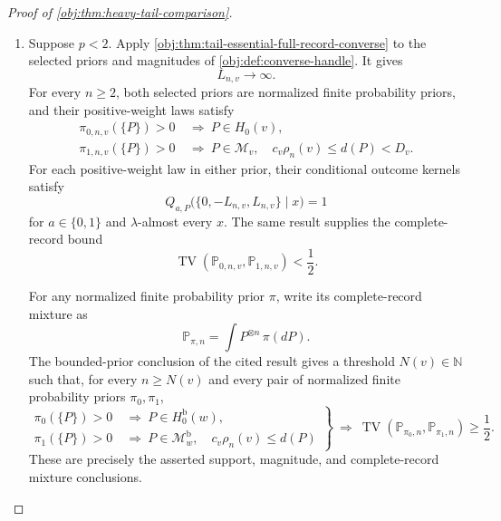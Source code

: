 \begin{proof}[Proof of \cref{obj:thm:heavy-tail-comparison}]
\begin{enumerate}
If \(p<2\), the two channel differences displayed above are strictly positive. Therefore
\[
E(p)\le E_0(p)<E_0(2),
\qquad
E(p)\le E_4(p)<E_4(2),
\]
and hence
\[
E(p)<\min\{E_0(2),E_4(2)\}=E(2).
\]
Using the scale definitions in \cref{obj:def:sharp-frontier-scales}, we obtain
\[
\frac{\rho_n(v)}{\rho_n^{\mathrm b}(w)}
=n^{E(2)-E(p)}
\longrightarrow\infty.
\]

\item Suppose \(p<2\). Apply \cref{obj:thm:tail-essential-full-record-converse} to the selected priors and magnitudes of \cref{obj:def:converse-handle}. It gives
\[
L_{n,v}\longrightarrow\infty.
\]
For every \(n\ge2\), both selected priors are normalized finite probability priors, and their positive-weight laws satisfy
\[
\begin{aligned}
\pi_{0,n,v}(\{P\})>0
&\ \Longrightarrow\ P\in H_0(v),\\
\pi_{1,n,v}(\{P\})>0
&\ \Longrightarrow\
P\in\mathcal M_v,\quad
c_v\rho_n(v)\le d(P)<D_v.
\end{aligned}
\]
For each positive-weight law in either prior, their conditional outcome kernels satisfy
\[
Q_{a,P}\bigl(\{0,-L_{n,v},L_{n,v}\}\mid x\bigr)=1
\]
for \(a\in\{0,1\}\) and \(\lambda\)-almost every \(x\). The same result supplies the complete-record bound
\[
\operatorname{TV}(\mathbb P_{0,n,v},\mathbb P_{1,n,v})
<\frac12.
\]

For any normalized finite probability prior \(\pi\), write its complete-record mixture as
\[
\mathbb P_{\pi,n}=\int P^{\otimes n}\,\pi(dP).
\]
The bounded-prior conclusion of the cited result gives a threshold \(N(v)\in\mathbb N\) such that, for every \(n\ge N(v)\) and every pair of normalized finite probability priors \(\pi_0,\pi_1\),
\[
\left.
\begin{aligned}
\pi_0(\{P\})>0&\ \Longrightarrow\ P\in H_0^{\mathrm b}(w),\\
\pi_1(\{P\})>0&\ \Longrightarrow\
P\in\mathcal M_w^{\mathrm b},\quad c_v\rho_n(v)\le d(P)
\end{aligned}
\right\}
\ \Longrightarrow\
\operatorname{TV}(\mathbb P_{\pi_0,n},\mathbb P_{\pi_1,n})
\ge\frac12.
\]
These are precisely the asserted support, magnitude, and complete-record mixture conclusions.


\end{enumerate}
\end{proof}
